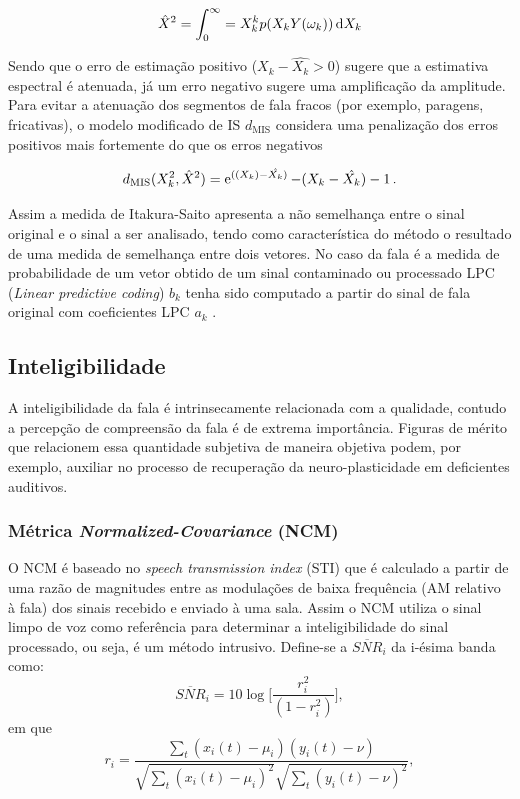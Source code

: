\begin{equation}
\hat{X}^2 = \int_0^\infty=X_k^{k}p(X_k Y(\omega_k))\operatorname{d\!} X_k
\end{equation}



Sendo que o erro de estimação positivo ($X_k - \hat{X_k} > 0$) sugere que a estimativa espectral é atenuada, já um erro negativo sugere uma amplificação da amplitude. Para evitar a atenuação dos segmentos de fala fracos (por exemplo, paragens, fricativas), o modelo modificado de IS $d_{\text{MIS}}$ considera uma penalização dos erros positivos mais fortemente do que os erros negativos~

\begin{equation}
d_{\text{MIS}}(X_k^2,\hat{X}^2) = \operatorname{e}^{((X_k)-\hat{X_k})}-(X_k-\hat{X_k})-1 \,.
\label{dmiss}
\end{equation}


Assim a medida de Itakura-Saito apresenta a não semelhança entre o sinal original e o sinal a ser analisado, tendo como característica do método o resultado de uma medida de semelhança entre dois vetores. No caso da fala é a medida de probabilidade de um vetor obtido de um sinal contaminado ou processado LPC (\textit{Linear predictive coding}) $b_k$ tenha sido computado a partir do sinal de fala original com coeficientes LPC $a_k$ \cite{leandro2007}.

\subsection{Inteligibilidade}
A inteligibilidade da fala é intrinsecamente relacionada com a qualidade, contudo a percepção de compreensão da fala é de extrema importância. Figuras de mérito que relacionem essa quantidade subjetiva de maneira objetiva podem, por exemplo, auxiliar no processo de recuperação da neuro-plasticidade em deficientes auditivos.

\subsubsection{Métrica \textit{Normalized-Covariance} (NCM)}
O NCM é baseado no \textit{speech transmission index} (STI) que é calculado a partir de uma razão de magnitudes entre as modulações de baixa frequência (AM relativo à fala) dos sinais recebido e enviado à uma sala. Assim o NCM utiliza o sinal limpo de voz como referência para determinar a inteligibilidade do sinal processado, ou seja, é um método intrusivo. Define-se a $\overline{SNR}_i$ da i-ésima banda como:
\begin{equation}
    \overline{SNR}_i = 10 \log{\bigg[\frac{r_i^2}{(1-r_i^2)}\bigg]},
\end{equation}
em que
\begin{equation}
    r_i = \frac{\sum\nolimits_{t} (x_i(t)-\mu_i)(y_i(t)-\nu)}{\sqrt{\sum\nolimits_{t} (x_i(t)-\mu_i)^2}\sqrt{\sum\nolimits_{t} (y_i(t)-\nu)^2}},
\end{equation}

